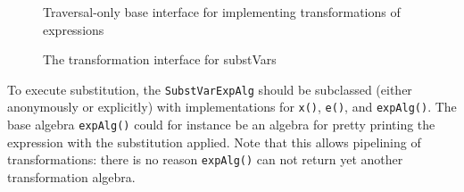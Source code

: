 \begin{figure}[t]
\vspace{-.1in}
\caption{Traversal-only base interface for implementing transformations of expressions}
\label{generic_transform}
\end{figure}


\begin{figure}[t]
\vspace{-.1in}
\caption{The transformation interface for substVars}
\label{substvars_with_id}
\end{figure}


To execute substitution, the \lstinline{SubstVarExpAlg} should be subclassed (either anonymously or explicitly) with implementations for \lstinline{x()}, \lstinline{e()}, and \lstinline{expAlg()}.
The base algebra \lstinline{expAlg()} could for instance be an algebra for pretty printing the expression with the substitution applied.
Note that this allows pipelining of transformations: there is no reason  \lstinline{expAlg()} can not return yet another transformation algebra. 




